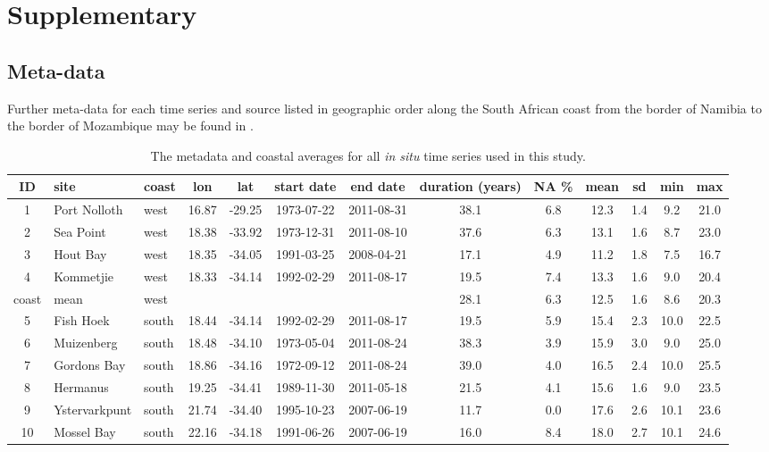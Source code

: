 \documentclass[a4paper,10pt,review]{elsarticle}
\begin{document}
\section*{Supplementary}
\subsection*{Meta-data}
Further meta-data for each time series and source listed in geographic order along the South African coast from the border of Namibia to the border of Mozambique may be found in .

\begin{table}[]
\caption{\small The metadata and coastal averages for all \emph{in situ} time series used in this study.}
\label{tableS1}
\centering
\tiny
\begin{tabular}{cllcccccccccc}
  \hline
 ID & site & coast & lon & lat & start date & end date & duration (years) & NA \% & mean & sd & min & max \\
  \hline
1 & Port Nolloth & west & 16.87 & -29.25 & 1973-07-22 & 2011-08-31 & 38.1 & 6.8 & 12.3 & 1.4 & 9.2 & 21.0 \\
2 & Sea Point & west & 18.38 & -33.92 & 1973-12-31 & 2011-08-10 & 37.6 & 6.3 & 13.1 & 1.6 & 8.7 & 23.0 \\
3 & Hout Bay & west & 18.35 & -34.05 & 1991-03-25 & 2008-04-21 & 17.1 & 4.9 & 11.2 & 1.8 & 7.5 & 16.7 \\
4 & Kommetjie & west & 18.33 & -34.14 & 1992-02-29 & 2011-08-17 & 19.5 & 7.4 & 13.3 & 1.6 & 9.0 & 20.4 \\
coast & mean & west &  &  &  &  & 28.1 & 6.3 & 12.5 & 1.6 & 8.6 & 20.3 \\
5 & Fish Hoek & south & 18.44 & -34.14 & 1992-02-29 & 2011-08-17 & 19.5 & 5.9 & 15.4 & 2.3 & 10.0 & 22.5 \\
6 & Muizenberg & south & 18.48 & -34.10 & 1973-05-04 & 2011-08-24 & 38.3 & 3.9 & 15.9 & 3.0 & 9.0 & 25.0 \\
7 & Gordons Bay & south & 18.86 & -34.16 & 1972-09-12 & 2011-08-24 & 39.0 & 4.0 & 16.5 & 2.4 & 10.0 & 25.5 \\
8 & Hermanus & south & 19.25 & -34.41 & 1989-11-30 & 2011-05-18 & 21.5 & 4.1 & 15.6 & 1.6 & 9.0 & 23.5 \\
9 & Ystervarkpunt & south & 21.74 & -34.40 & 1995-10-23 & 2007-06-19 & 11.7 & 0.0 & 17.6 & 2.6 & 10.1 & 23.6 \\
10 & Mossel Bay & south & 22.16 & -34.18 & 1991-06-26 & 2007-06-19 & 16.0 & 8.4 & 18.0 & 2.7 & 10.1 & 24.6 \\

\end{tabular}
\end{table}
\end{document}
